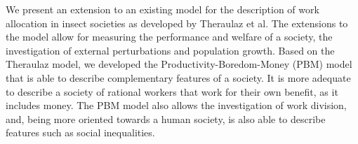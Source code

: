 We present an extension to an existing model for the description of work allocation in insect societies as developed by Theraulaz et al. The extensions to the model allow for measuring the performance and welfare of a society, the investigation of external perturbations and population growth.
Based on the Theraulaz model, we developed the Productivity-Boredom-Money (PBM) model that is able to describe complementary features of a society. It is more adequate to describe a society of rational workers that work for their own benefit, as it includes money. The PBM model also allows the investigation of work division, and, being more oriented towards a human society, is also able to describe features such as social inequalities.
